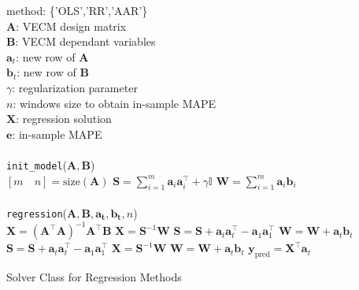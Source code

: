 \begin{algorithm}[ht]
\begin{algorithmic}[1]
\REQUIRE $\,$ \\
method: \{'OLS','RR','AAR'\} \\
$\mathbf{A}$: VECM design matrix \\
$\mathbf{B}$: VECM dependant variables \\
$\mathbf{a}_t$: new row of $\mathbf{A}$ \\
$\mathbf{b}_t$: new row of $\mathbf{B}$ \\
$\gamma$: regularization parameter \\
$n$: windows size to obtain in-sample MAPE \\
\ENSURE  $\,$ \\
$\mathbf{X}$: regression solution \\
$\mathbf{e}$: in-sample MAPE \\
\quad \\
\texttt{init\_model}($\mathbf{A},\mathbf{B}$)\\
\STATE $ [m \quad n] = \text{size}(\mathbf{A}) $ 
\STATE $\mathbf{S} = \displaystyle \sum_{i=1}^m \mathbf{a}_i \mathbf{a}_i^\top + \gamma \mathbb{I}$
\STATE $\mathbf{W} = \displaystyle \sum_{i=1}^m \mathbf{a}_i \mathbf{b}_i$
\ENDIF \\
\quad \\
\texttt{regression}($\mathbf{A},\mathbf{B},\mathbf{a_t},\mathbf{b_t},n$) \\
        \STATE $\mathbf{X}=(\mathbf{A}^\top \mathbf{A})^{-1}\mathbf{A}^\top
        \mathbf{B}$
        \STATE $\mathbf{X} = \mathbf{S}^{-1} \mathbf{W} $
        \STATE $\mathbf{S} = \mathbf{S}+
        \mathbf{a}_t \mathbf{a}_t^\top-
        \mathbf{a}_1 \mathbf{a}_1^\top$
        \STATE $\mathbf{W} = \mathbf{W} + \mathbf{a}_t \mathbf{b}_t$
        \STATE $\mathbf{S} = \mathbf{S}+
        \mathbf{a}_t \mathbf{a}_t^\top-
        \mathbf{a}_1 \mathbf{a}_1^\top$
        \STATE $\mathbf{X} = \mathbf{S}^{-1} \mathbf{W} $
        \STATE $\mathbf{W} = \mathbf{W} + \mathbf{a}_t \mathbf{b}_t$
\ENDIF
\STATE $\mathbf{y}_{\text{pred}} = \mathbf{X}^\top \mathbf{a}_t$
\end{algorithmic}
\caption{Solver Class for Regression Methods}
\label{alg:solver}
\end{algorithm}




